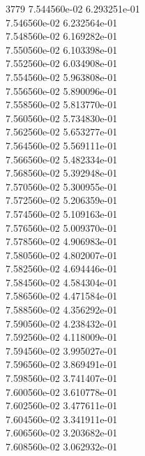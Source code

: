 3779	7.544560e-02	6.293251e-01	\\ 	7.546560e-02	6.232564e-01	\\ 	7.548560e-02	6.169282e-01	\\ 	7.550560e-02	6.103398e-01	\\ 	7.552560e-02	6.034908e-01	\\ 	7.554560e-02	5.963808e-01	\\ 	7.556560e-02	5.890096e-01	\\ 	7.558560e-02	5.813770e-01	\\ 	7.560560e-02	5.734830e-01	\\ 	7.562560e-02	5.653277e-01	\\ 	7.564560e-02	5.569111e-01	\\ 	7.566560e-02	5.482334e-01	\\ 	7.568560e-02	5.392948e-01	\\ 	7.570560e-02	5.300955e-01	\\ 	7.572560e-02	5.206359e-01	\\ 	7.574560e-02	5.109163e-01	\\ 	7.576560e-02	5.009370e-01	\\ 	7.578560e-02	4.906983e-01	\\ 	7.580560e-02	4.802007e-01	\\ 	7.582560e-02	4.694446e-01	\\ 	7.584560e-02	4.584304e-01	\\ 	7.586560e-02	4.471584e-01	\\ 	7.588560e-02	4.356292e-01	\\ 	7.590560e-02	4.238432e-01	\\ 	7.592560e-02	4.118009e-01	\\ 	7.594560e-02	3.995027e-01	\\ 	7.596560e-02	3.869491e-01	\\ 	7.598560e-02	3.741407e-01	\\ 	7.600560e-02	3.610778e-01	\\ 	7.602560e-02	3.477611e-01	\\ 	7.604560e-02	3.341911e-01	\\ 	7.606560e-02	3.203682e-01	\\ 	7.608560e-02	3.062932e-01	\\ \hline
